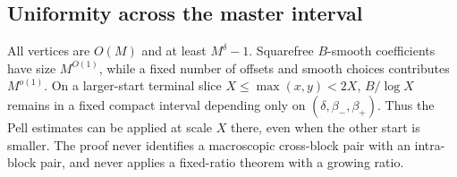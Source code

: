 \subsection{Uniformity across the master interval}
All vertices are $O(M)$ and at least $M^\delta-1$. Squarefree
$B$-smooth coefficients have size $M^{O(1)}$, while a fixed number of
offsets and smooth choices contributes $M^{o(1)}$. On a larger-start
terminal slice $X\le\max(x,y)<2X$, $B/\log X$ remains in a fixed
compact interval depending only on $(\delta,\beta_-,\beta_+)$. Thus the
Pell estimates can be applied at scale $X$ there, even when the other
start is smaller. The proof never identifies a macroscopic cross-block
pair with an intra-block pair, and never applies a fixed-ratio theorem
with a growing ratio.

